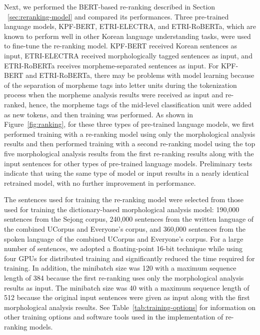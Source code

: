 \documentclass[AMS,STIX2COL]{WileyNJD-v2}
\begin{document}
    Next, we performed the BERT-based re-ranking described in Section ~\ref{sec:reranking-model} and compared its performances.
    Three pre-trained language models, KPF-BERT, ETRI-ELECTRA, and ETRI-RoBERTa, which are known to perform well in other Korean language understanding tasks, were used to fine-tune the re-ranking model.
    KPF-BERT received Korean sentences as input, ETRI-ELECTRA received morphologically tagged sentences as input, and ETRI-RoBERTa receives morpheme-separated sentences as input.
    For KPF-BERT and ETRI-RoBERTa, there may be problems with model learning because of the separation of morpheme tags into letter units during the tokenization process when the morpheme analysis results were received as input and re-ranked, hence, the morpheme tags of the mid-level classification unit were added as new tokens, and then training was performed.
    As shown in Figure~\ref{fig:ranking}, for these three types of pre-trained language models, we first performed training with a re-ranking model using only the morphological analysis results and then performed training with a second re-ranking model using the top five morphological analysis results from the first re-ranking results along with the input sentences for other types of pre-trained language models.
    Preliminary tests indicate that using the same type of model or input results in a nearly identical retrained model, with no further improvement in performance.

    The sentences used for training the re-ranking model were selected from those used for training the dictionary-based morphological analysis model: 190,000 sentences from the Sejong corpus, 240,000 sentences from the written language of the combined UCorpus and Everyone's corpus, and 360,000 sentences from the spoken language of the combined UCorpus and Everyone's corpus.
    For a large number of sentences, we adopted a floating-point 16-bit technique while using four GPUs for distributed training and significantly reduced the time required for training.
    In addition, the minibatch size was 120 with a maximum sequence length of 384 because the first re-ranking uses only the morphological analysis results as input.
    The minibatch size was 40 with a maximum sequence length of 512 because the original input sentences were given as input along with the first morphological analysis results.
    See Table~\ref{tab:training-options} for information on other training options and software tools used in the implementation of re-ranking models.
\end{document}
